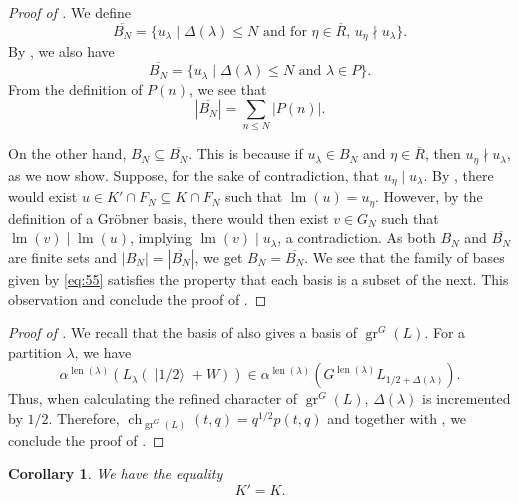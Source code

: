 \documentclass[a4paper, 12pt, reqno]{amsart}
\newtheorem{corollary}[theorem]{Corollary}
\theoremstyle{remark}
\DeclareMathOperator{\gr}{gr}
\DeclareMathOperator{\ch}{ch}
\DeclareMathOperator{\lm}{lm}
\DeclareMathOperator{\len}{len}
\DeclareMathOperator{\vachalf}{|1/2\rangle}
\begin{document}
\begin{proof}[Proof of ]
  We define
  \begin{equation*}
    \overline{B_N} = \{u_{\lambda} \mid \text{$\Delta(\lambda) \le N$ and for $\eta \in \overline{R}$, $u_{\eta} \nmid u_{\lambda}$}\}.
  \end{equation*}
  By , we also have
  \begin{equation*}
    \overline{B_N} = \{u_{\lambda} \mid \text{$\Delta(\lambda) \le N$ and $\lambda \in P$}\}.
  \end{equation*}
  From the definition of $P(n)$, we see that
  \begin{equation*}
    |\overline{B_N}| = \sum_{n \le N}|P(n)|.
  \end{equation*}

  On the other hand, $B_N \subseteq \overline{B_N}$.
  This is because if $u_{\lambda} \in B_N$ and $\eta \in \overline{R}$, then $u_{\eta} \nmid u_{\lambda}$, as we now show.
  Suppose, for the sake of contradiction, that $u_{\eta} \mid u_{\lambda}$.
  By , there would exist $u \in K' \cap F_N \subseteq K \cap F_N$ such that $\lm(u) = u_{\eta}$.
  However, by the definition of a Gröbner basis, there would then exist $v \in G_N$ such that $\lm(v) \mid \lm(u)$, implying $\lm(v) \mid u_{\lambda}$, a contradiction.
  As both $B_N$ and $\overline{B_N}$ are finite sets and $|B_N| = |\overline{B_N}|$, we get $B_N = \overline{B_N}$.
  We see that the family of bases given by \eqref{eq:55} satisfies the property that each basis is a subset of the next.
  This observation and  conclude the proof of .
\end{proof}

\begin{proof}[Proof of ]
  We recall that the basis of  also gives a basis of $\gr^G(L)$.
  For a partition $\lambda$, we have
  \begin{equation*}
    \alpha^{\len(\lambda)}(L_{\lambda}(\vachalf + W)) \in \alpha^{\len(\lambda)}(G^{\len(\lambda)}L_{1/2 + \Delta(\lambda)}).
  \end{equation*}
  Thus, when calculating the refined character of $\gr^G(L)$, $\Delta(\lambda)$ is incremented by $1/2$.
  Therefore, $\ch_{\gr^G(L)}(t, q) = q^{1/2}p(t, q)$ and together with , we conclude the proof of .
\end{proof}

\begin{corollary}
  \label{crl:3}
  We have the equality
  \begin{equation*}
    K' = K.
  \end{equation*}
\end{corollary}
\end{document}
